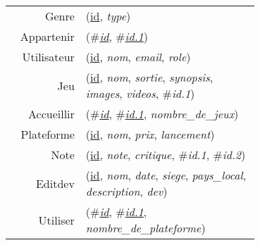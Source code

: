 
\usepackage[normalem]{ulem}
\newenvironment{mld}
  {\par\begin{minipage}{\linewidth}\begin{tabular}{rp{0.7\linewidth}}}
  {\end{tabular}\end{minipage}\par}
\newcommand{\relat}[1]{\textsc{#1}}
\newcommand{\attr}[1]{\emph{#1}}
\newcommand{\prim}[1]{\uline{#1}}
\newcommand{\foreign}[1]{\#\textsl{#1}}


\begin{mld}
  Genre & (\prim{id}, \attr{type})\\
  Appartenir & (\foreign{\prim{id}}, \foreign{\prim{id.1}})\\
  Utilisateur & (\prim{id}, \attr{nom}, \attr{email}, \attr{role})\\
  Jeu & (\prim{id}, \attr{nom}, \attr{sortie}, \attr{synopsis}, \attr{images}, \attr{videos}, \foreign{id.1})\\
  Accueillir & (\foreign{\prim{id}}, \foreign{\prim{id.1}}, \attr{nombre\_de\_jeux})\\
  Plateforme & (\prim{id}, \attr{nom}, \attr{prix}, \attr{lancement})\\
  Note & (\prim{id}, \attr{note}, \attr{critique}, \foreign{id.1}, \foreign{id.2})\\
  Editdev & (\prim{id}, \attr{nom}, \attr{date}, \attr{siege}, \attr{pays\_local}, \attr{description}, \attr{dev})\\
  Utiliser & (\foreign{\prim{id}}, \foreign{\prim{id.1}}, \attr{nombre\_de\_plateforme})\\
\end{mld}